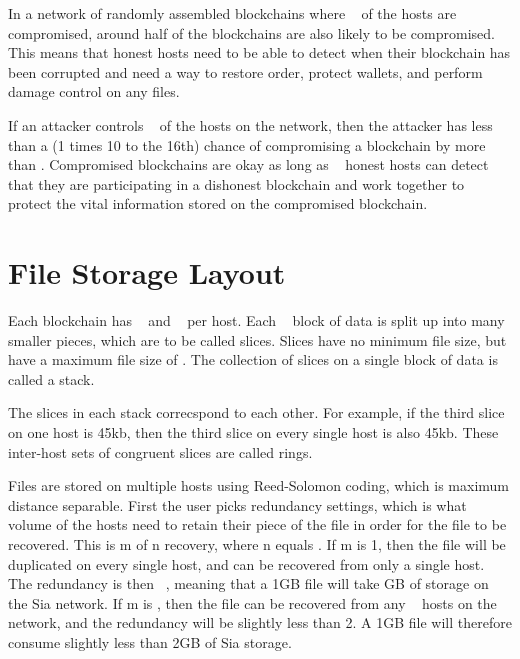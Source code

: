 \documentclass[twocolumn]{article}
\begin{document}
In a network of randomly assembled blockchains where \fortynine ~ of the hosts are compromised, around half of the blockchains are also likely to be compromised.
This means that honest hosts need to be able to detect when their blockchain has been corrupted and need a way to restore order, protect wallets, and perform damage control on any files.

If an attacker controls \fortynine ~ of the hosts on the network, then the attacker has less than a (1 times 10 to the 16th) chance of compromising a blockchain by more than \maxcorruption.
Compromised blockchains are okay as long as \inversemaxcorruption ~ honest hosts can detect that they are participating in a dishonest blockchain and work together to protect the vital information stored on the compromised blockchain.


\section{File Storage Layout}

Each blockchain has \numhosts ~ and \storageperhost ~ per host.
Each \storageperhost ~ block of data is split up into many smaller pieces, which are to be called slices.
Slices have no minimum file size, but have a maximum file size of \maxslicesize.
The collection of slices on a single block of data is called a stack.

The slices in each stack correcspond to each other.
For example, if the third slice on one host is 45kb, then the third slice on every single host is also 45kb.
These inter-host sets of congruent slices are called rings.

Files are stored on multiple hosts using Reed-Solomon coding, which is maximum distance separable.
First the user picks redundancy settings, which is what volume of the hosts need to retain their piece of the file in order for the file to be recovered.
This is m of n recovery, where n equals \numhosts.
If m is 1, then the file will be duplicated on every single host, and can be recovered from only a single host.
The redundancy is then \numhosts ~, meaning that a 1GB file will take \numhosts GB of storage on the Sia network.
If m is \fiftyone, then the file can be recovered from any \fiftyone ~ hosts on the network, and the redundancy will be slightly less than 2.
A 1GB file will therefore consume slightly less than 2GB of Sia storage.
\end{document}
